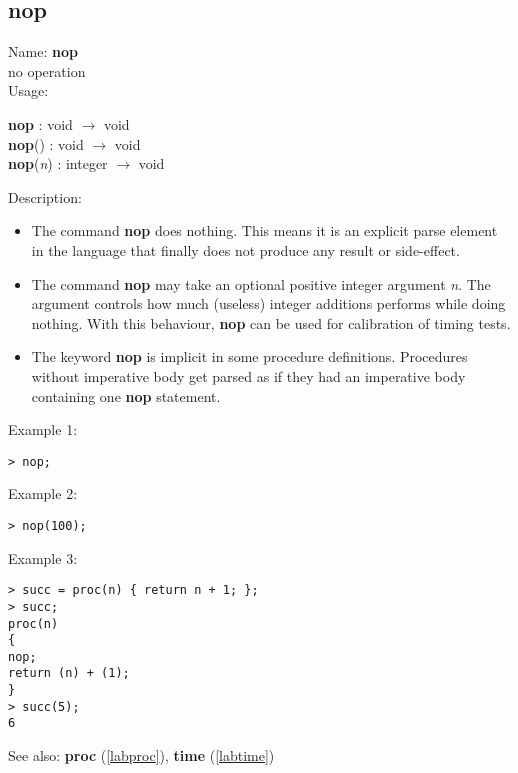 \subsection{nop}
\label{labnop}
\noindent Name: \textbf{nop}\\
no operation\\
\noindent Usage: 
\begin{center}
\textbf{nop} : \textsf{void} $\rightarrow$ \textsf{void}\\
\textbf{nop}() : \textsf{void} $\rightarrow$ \textsf{void}\\
\textbf{nop}(\emph{n}) : \textsf{integer} $\rightarrow$ \textsf{void}\\
\end{center}
\noindent Description: \begin{itemize}

\item The command \textbf{nop} does nothing. This means it is an explicit parse
   element in the \sollya language that finally does not produce any
   result or side-effect.

\item The command \textbf{nop} may take an optional positive integer argument \emph{n}. The argument controls how much (useless) integer additions \sollya performs while doing nothing. 
   With this behaviour, \textbf{nop} can be used for calibration of timing tests.

\item The keyword \textbf{nop} is implicit in some procedure
   definitions. Procedures without imperative body get parsed as if they
   had an imperative body containing one \textbf{nop} statement.
\end{itemize}
\noindent Example 1: 
\begin{center}\begin{minipage}{15cm}\begin{Verbatim}[frame=single]
> nop;
\end{Verbatim}
\end{minipage}\end{center}
\noindent Example 2: 
\begin{center}\begin{minipage}{15cm}\begin{Verbatim}[frame=single]
> nop(100);
\end{Verbatim}
\end{minipage}\end{center}
\noindent Example 3: 
\begin{center}\begin{minipage}{15cm}\begin{Verbatim}[frame=single]
> succ = proc(n) { return n + 1; };
> succ;
proc(n)
{
nop;
return (n) + (1);
}
> succ(5);
6
\end{Verbatim}
\end{minipage}\end{center}
See also: \textbf{proc} (\ref{labproc}), \textbf{time} (\ref{labtime})
